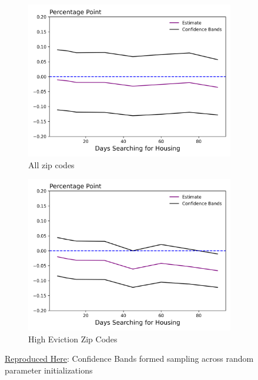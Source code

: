 \documentclass[a4paper,12pt]{article}
\begin{document}
\begin{figure}[htbp]
\centering
\begin{subfigure}{.48\textwidth}
    \centering
    \includegraphics[width=.95\linewidth]{figures/rtc/results/cceh/rfp_False_False.png}
    \caption{All zip codes}
    \label{SUBFIGURE LABEL 3}
\end{subfigure}
\begin{subfigure}{.48\textwidth}
    \centering
    \includegraphics[width=.95\linewidth]{figures/rtc/results/cceh/rfp_True_False.png}
    \caption{High Eviction Zip Codes}
    \label{SUBFIGURE LABEL 4}
\end{subfigure}
\caption{ \href{https://github.com/pharringtonp19/evictions/blob/main/scripts/cceh/primary/cluster_diff_n_diff.py}{Reproduced Here}: Confidence Bands formed sampling across random parameter initializations}
\label{fig:rfp_results}
\end{figure}
\end{document}
